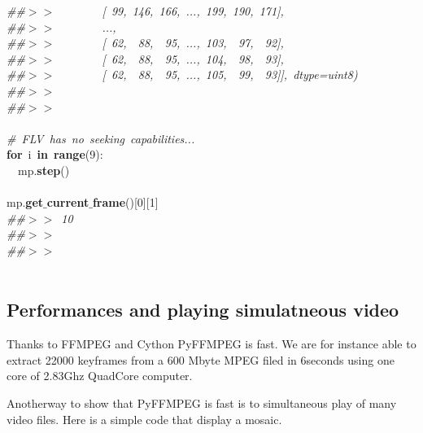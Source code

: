 \documentclass{report}
\begin{document}
\begin{minipage}{\textwidth}
{\mbox{}\textit{\#\#$>$$>$\ \ \ \ \ \ \ \ [\ 99,\ 146,\ 166,\ ...,\ 199,\ 190,\ 171],} \\
\mbox{}\textit{\#\#$>$$>$\ \ \ \ \ \ \ \ ...,\ } \\
\mbox{}\textit{\#\#$>$$>$\ \ \ \ \ \ \ \ [\ 62,\ \ 88,\ \ 95,\ ...,\ 103,\ \ 97,\ \ 92],} \\
\mbox{}\textit{\#\#$>$$>$\ \ \ \ \ \ \ \ [\ 62,\ \ 88,\ \ 95,\ ...,\ 104,\ \ 98,\ \ 93],} \\
\mbox{}\textit{\#\#$>$$>$\ \ \ \ \ \ \ \ [\ 62,\ \ 88,\ \ 95,\ ...,\ 105,\ \ 99,\ \ 93]],\ dtype=uint8)} \\
\mbox{}\textit{\#\#$>$$>$\ } \\
\mbox{}\textit{\#\#$>$$>$\ } \\
\mbox{} \\
\mbox{}\textit{\#\ FLV\ has\ no\ seeking\ capabilities...} \\
\mbox{}\textbf{for}\ i\ \textbf{in}\ \textbf{range}(9): \\
\mbox{}\ \ mp.\textbf{step}() \\
\mbox{} \\
\mbox{}mp.\textbf{get$\_$current$\_$frame}()[0][1] \\
\mbox{}\textit{\#\#$>$$>$\ 10} \\
\mbox{}\textit{\#\#$>$$>$\ } \\
\mbox{}\textit{\#\#$>$$>$\ } \\
\mbox{} \\
\mbox{}
}
\end{minipage}







\subsection{Performances and playing simulatneous video}
Thanks to FFMPEG and Cython PyFFMPEG is fast.
We are for instance able to extract 22000 keyframes from a 600 Mbyte MPEG filed in 6seconds using one core of 2.83Ghz QuadCore computer.

Anotherway to show that PyFFMPEG is fast is to simultaneous play of many video files.
Here is a simple code that display a mosaic.
\end{document}
